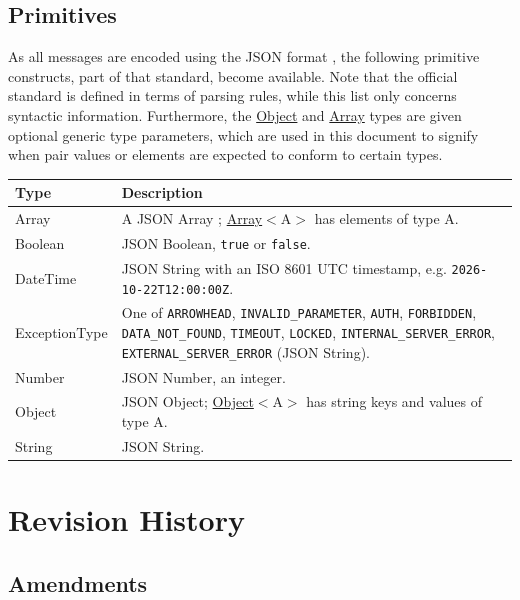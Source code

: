 \documentclass[a4paper]{arrowhead}
\newcommand{\pdef}[1]{{\textcolor{ArrowheadGrey}{#1 \label{sec:model:primitives:#1} \label{sec:model:primitives:#1s}}}}
\newcommand{\pref}[1]{{\textcolor{ArrowheadGrey}{\hyperref[sec:model:primitives:#1]{#1}}}}
\begin{document}
\subsection{Primitives}
\label{sec:model:primitives}

As all messages are encoded using the JSON format \cite{rfc8259}, the following primitive constructs, part of that standard, become available.
Note that the official standard is defined in terms of parsing rules, while this list only concerns syntactic information.
Furthermore, the \pref{Object} and \pref{Array} types are given optional generic type parameters, which are used in this document to signify when pair values or elements are expected to conform to certain types.

\noindent\begin{tabularx}{\textwidth}{| p{4.6cm} | X |} \hline
\rowcolor{gray!33} Type & Description \\ \hline
\pdef{Array} & A JSON Array \cite{rfc8259}; \pref{Array}$<$A$>$ has elements of type A. \\ \hline
\pdef{Boolean} & JSON Boolean, \texttt{true} or \texttt{false}. \\ \hline
\pdef{DateTime} & JSON String with an ISO 8601 UTC timestamp, e.g. \texttt{2026-10-22T12:00:00Z}. \\ \hline
\pdef{ExceptionType} & One of \texttt{ARROWHEAD}, \texttt{INVALID\_\allowbreak{}PARAMETER}, \texttt{AUTH}, \texttt{FORBIDDEN}, \texttt{DATA\_\allowbreak{}NOT\_\allowbreak{}FOUND}, \texttt{TIMEOUT}, \texttt{LOCKED}, \texttt{INTERNAL\_\allowbreak{}SERVER\_\allowbreak{}ERROR}, \texttt{EXTERNAL\_\allowbreak{}SERVER\_\allowbreak{}ERROR} (JSON String). \\ \hline
\pdef{Number} & JSON Number, an integer. \\ \hline
\pdef{Object} & JSON Object; \pref{Object}$<$A$>$ has string keys and values of type A. \\ \hline
\pdef{String} & JSON String. \\ \hline
\end{tabularx}

\newpage




\newpage

\section{Revision History}
\subsection{Amendments}
\end{document}
